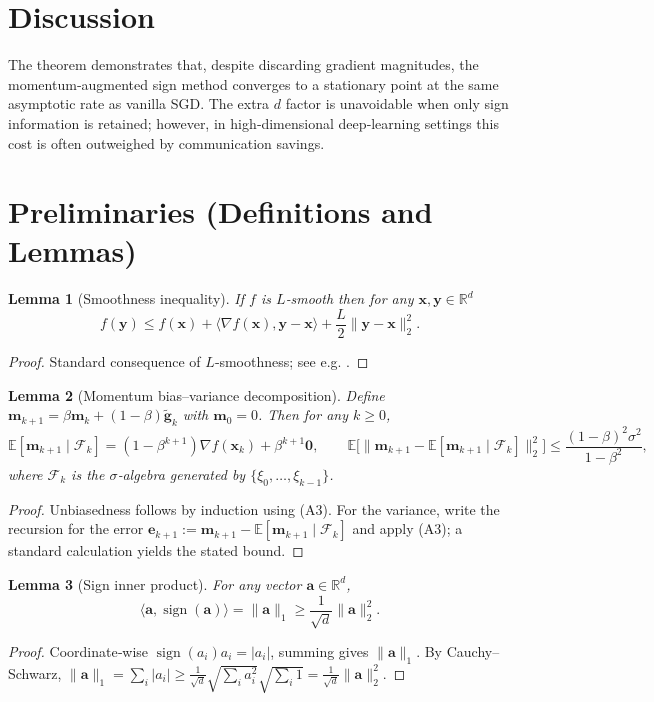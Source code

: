\documentclass{article}
\newtheorem{lemma}{Lemma}
\newcommand{\sign}{\operatorname{sign}}
\newcommand{\E}{\mathbb{E}}
\newcommand{\R}{\mathbb{R}}
\begin{document}
\section*{Discussion}
The theorem demonstrates that, despite discarding gradient magnitudes, the momentum‑augmented sign method converges to a stationary point at the same asymptotic rate as vanilla SGD. The extra $d$ factor is unavoidable when only sign information is retained; however, in high‑dimensional deep‑learning settings this cost is often outweighed by communication savings.

\newpage
\section*{Preliminaries (Definitions and Lemmas)}
\begin{lemma}[Smoothness inequality]\label{lem:smooth}
If $f$ is $L$‑smooth then for any $\bm{x},\bm{y}\in\R^{d}$
\[
f(\bm{y})\le f(\bm{x})+\langle\nabla f(\bm{x}),\bm{y}-\bm{x}\rangle+\frac{L}{2}\|\bm{y}-\bm{x}\|_{2}^{2}.
\tag{3}
\]
\end{lemma}
\begin{proof}
Standard consequence of $L$‑smoothness; see e.g. \cite{Nesterov2004}. \qedhere
\end{proof}

\begin{lemma}[Momentum bias–variance decomposition]\label{lem:mom-var}
Define $\bm{m}_{k+1}= \beta\bm{m}_{k}+(1-\beta)\tilde{\bm{g}}_{k}$ with $\bm{m}_{0}=0$. Then for any $k\ge0$,
\[
\E[\bm{m}_{k+1}\mid\mathcal{F}_{k}] = (1-\beta^{k+1})\nabla f(\bm{x}_{k}) + \beta^{k+1}\bm{0},
\qquad
\E\!\big[\|\bm{m}_{k+1}-\E[\bm{m}_{k+1}\mid\mathcal{F}_{k}]\|_{2}^{2}\big]\le \frac{(1-\beta)^{2}\sigma^{2}}{1-\beta^{2}},
\tag{4}
\]
where $\mathcal{F}_{k}$ is the $\sigma$‑algebra generated by $\{\xi_{0},\dots,\xi_{k-1}\}$.
\end{lemma}
\begin{proof}
Unbiasedness follows by induction using (A3). For the variance, write the recursion for the error $\bm{e}_{k+1}:=\bm{m}_{k+1}-\E[\bm{m}_{k+1}\mid\mathcal{F}_{k}]$ and apply (A3); a standard calculation yields the stated bound. \qedhere
\end{proof}

\begin{lemma}[Sign inner product]\label{lem:sign-ip}
For any vector $\bm{a}\in\R^{d}$,
\[
\langle \bm{a},\sign(\bm{a})\rangle = \|\bm{a}\|_{1}\ge \frac{1}{\sqrt{d}}\|\bm{a}\|_{2}^{2}. \tag{5}
\]
\end{lemma}
\begin{proof}
Coordinate‑wise $\sign(a_{i})a_{i}=|a_{i}|$, summing gives $\|\bm{a}\|_{1}$. By Cauchy–Schwarz,
$\|\bm{a}\|_{1} = \sum_{i}|a_{i}| \ge \frac{1}{\sqrt{d}}\sqrt{\sum_{i}a_{i}^{2}}\sqrt{\sum_{i}1}= \frac{1}{\sqrt{d}}\|\bm{a}\|_{2}^{2}$. \qedhere
\end{proof}
\end{document}
